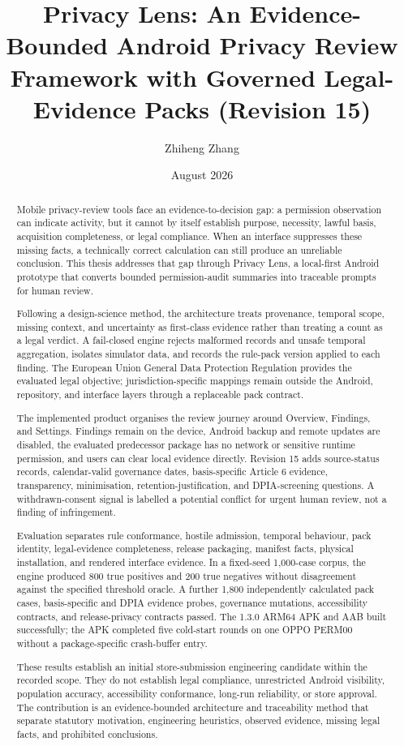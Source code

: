 \documentclass[11pt,a4paper]{article}
\title{Privacy Lens: An Evidence-Bounded Android Privacy Review Framework with Governed Legal-Evidence Packs (Revision 15)}
\author{Zhiheng Zhang}
\date{August 2026}
\begin{document}
\maketitle
\begin{abstract}
\small\singlespacing
Mobile privacy-review tools face an evidence-to-decision gap: a permission observation can indicate activity, but it cannot by itself establish purpose, necessity, lawful basis, acquisition completeness, or legal compliance. When an interface suppresses these missing facts, a technically correct calculation can still produce an unreliable conclusion. This thesis addresses that gap through Privacy Lens, a local-first Android prototype that converts bounded permission-audit summaries into traceable prompts for human review.

Following a design-science method, the architecture treats provenance, temporal scope, missing context, and uncertainty as first-class evidence rather than treating a count as a legal verdict. A fail-closed engine rejects malformed records and unsafe temporal aggregation, isolates simulator data, and records the rule-pack version applied to each finding. The European Union General Data Protection Regulation provides the evaluated legal objective; jurisdiction-specific mappings remain outside the Android, repository, and interface layers through a replaceable pack contract.

The implemented product organises the review journey around Overview, Findings, and Settings. Findings remain on the device, Android backup and remote updates are disabled, the evaluated predecessor package has no network or sensitive runtime permission, and users can clear local evidence directly. Revision 15 adds source-status records, calendar-valid governance dates, basis-specific Article 6 evidence, transparency, minimisation, retention-justification, and DPIA-screening questions. A withdrawn-consent signal is labelled a potential conflict for urgent human review, not a finding of infringement.

Evaluation separates rule conformance, hostile admission, temporal behaviour, pack identity, legal-evidence completeness, release packaging, manifest facts, physical installation, and rendered interface evidence. In a fixed-seed 1,000-case corpus, the engine produced 800 true positives and 200 true negatives without disagreement against the specified threshold oracle. A further 1,800 independently calculated pack cases, basis-specific and DPIA evidence probes, governance mutations, accessibility contracts, and release-privacy contracts passed. The 1.3.0 ARM64 APK and AAB built successfully; the APK completed five cold-start rounds on one OPPO PERM00 without a package-specific crash-buffer entry.

These results establish an initial store-submission engineering candidate within the recorded scope. They do not establish legal compliance, unrestricted Android visibility, population accuracy, accessibility conformance, long-run reliability, or store approval. The contribution is an evidence-bounded architecture and traceability method that separate statutory motivation, engineering heuristics, observed evidence, missing legal facts, and prohibited conclusions.
\end{abstract}
\end{document}
